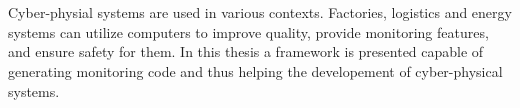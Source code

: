 \chapter{\bevezetes}

Cyber-physial systems are used in various contexts. Factories, logistics and energy systems can utilize computers to improve quality, provide monitoring features, and ensure safety for them. In this thesis a framework is presented capable of generating monitoring code and thus helping the developement of cyber-physical systems. 



